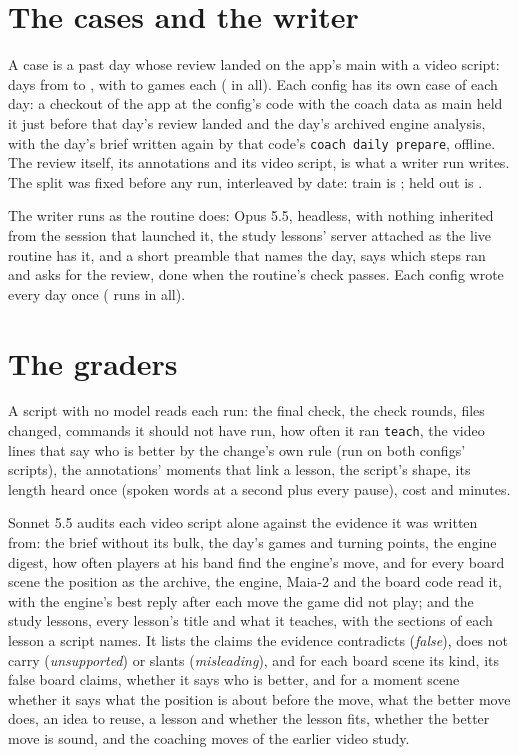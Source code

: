 \documentclass[11pt]{article}
\begin{document}
\section{The cases and the writer}

A case is a past day whose review landed on the app's main with a video script: \Days{} days from
\FirstDay{} to \LastDay, with \GamesMin{} to \GamesMax{} games each (\GamesAll{} in all). Each config
has its own case of each day: a checkout of the app at the config's code with the coach data as
main held it just before that day's review landed and the day's archived engine analysis, with the
day's brief written again by that code's \texttt{coach daily prepare}, offline. The review itself,
its annotations and its video script, is what a writer run writes. The split was fixed before any
run, interleaved by date: train is \TrainDays; held out is \HeldDays.

The writer runs as the routine does: Opus 5.5, headless, with nothing inherited from the session
that launched it, the study lessons' server attached as the live routine has it, and a short
preamble that names the day, says which steps ran and asks for the review, done when the routine's
check passes. Each config wrote every day once (\WriterRuns{} runs in all).

\section{The graders}

A script with no model reads each run: the final check, the check rounds, files changed, commands
it should not have run, how often it ran \texttt{teach}, the video lines that say who is better by
the change's own rule (run on both configs' scripts), the annotations' moments that link a lesson,
the script's shape, its length heard once (spoken words at \WordsPerSecond{} a second plus every
pause), cost and minutes.

Sonnet 5.5 audits each video script alone against the evidence it was written from: the brief
without its bulk, the day's games and turning points, the engine digest, how often players at his
band find the engine's move, and for every board scene the position as the archive, the engine,
Maia-2 and the board code read it, with the engine's best reply after each move the game did not
play; and the study lessons, every lesson's title and what it teaches, with the sections of each
lesson a script names. It lists the claims the evidence contradicts (\emph{false}), does not carry
(\emph{unsupported}) or slants (\emph{misleading}), and for each board scene its kind, its false
board claims, whether it says who is better, and for a moment scene whether it says what the
position is about before the move, what the better move does, an idea to reuse, a lesson and
whether the lesson fits, whether the better move is sound, and the coaching moves of the earlier
video study.
\end{document}
